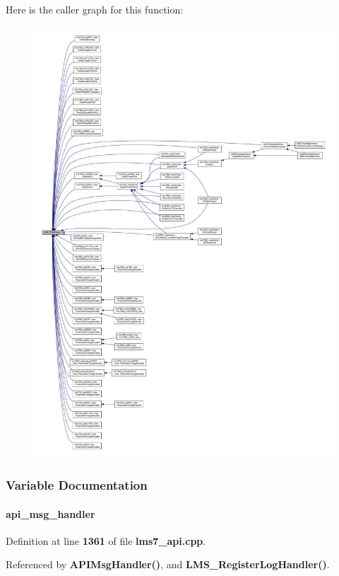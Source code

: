 Here is the caller graph for this function\+:
\nopagebreak
\begin{figure}[H]
\begin{center}
\leavevmode
\includegraphics[width=350pt]{df/de1/lms7__api_8cpp_a29da2b25b3336c31d75b70bb4eb32673_icgraph}
\end{center}
\end{figure}




\subsubsection{Variable Documentation}
\paragraph[{api\+\_\+msg\+\_\+handler}]{ api\+\_\+msg\+\_\+handler\hspace{0.3cm}{\ttfamily [static]}}\label{lms7__api_8cpp_adb072caafd5dd49158beff108c9d50a2}


Definition at line {\bf 1361} of file {\bf lms7\+\_\+api.\+cpp}.



Referenced by {\bf A\+P\+I\+Msg\+Handler()}, and {\bf L\+M\+S\+\_\+\+Register\+Log\+Handler()}.


